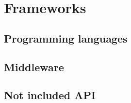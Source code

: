 \chapter{Frameworks}
 

\section{Programming languages}


\section{Middleware}


\section{Not included API}		